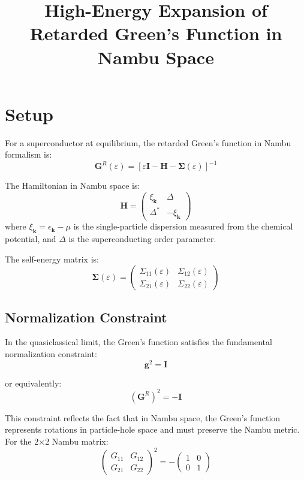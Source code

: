 \documentclass[12pt]{article}
\title{High-Energy Expansion of Retarded Green's Function in Nambu Space}
\author{}
\date{}
\begin{document}
\maketitle

\section{Setup}

For a superconductor at equilibrium, the retarded Green's function in Nambu formalism is:
\begin{equation}
\mathbf{G}^R(\varepsilon) = \left[\varepsilon \mathbf{I} - \mathbf{H} - \mathbf{\Sigma}(\varepsilon)\right]^{-1}
\end{equation}

The Hamiltonian in Nambu space is:
\begin{equation}
\mathbf{H} = \begin{pmatrix}
\xi_{\mathbf{k}} & \Delta \\
\Delta^* & -\xi_{\mathbf{k}}
\end{pmatrix}
\end{equation}
where $\xi_{\mathbf{k}} = \epsilon_{\mathbf{k}} - \mu$ is the single-particle dispersion measured from the chemical potential, and $\Delta$ is the superconducting order parameter.

The self-energy matrix is:
\begin{equation}
\mathbf{\Sigma}(\varepsilon) = \begin{pmatrix}
\Sigma_{11}(\varepsilon) & \Sigma_{12}(\varepsilon) \\
\Sigma_{21}(\varepsilon) & \Sigma_{22}(\varepsilon)
\end{pmatrix}
\end{equation}

\subsection{Normalization Constraint}

In the quasiclassical limit, the Green's function satisfies the fundamental normalization constraint:
\begin{equation}
\mathbf{g}^2 = \mathbf{I}
\end{equation}

or equivalently:
\begin{equation}
(\mathbf{G}^R)^2 = -\mathbf{I}
\end{equation}

This constraint reflects the fact that in Nambu space, the Green's function represents rotations in particle-hole space and must preserve the Nambu metric. For the 2×2 Nambu matrix:
\begin{equation}
\begin{pmatrix}
G_{11} & G_{12} \\
G_{21} & G_{22}
\end{pmatrix}^2 = -\begin{pmatrix}
1 & 0 \\
0 & 1
\end{pmatrix}
\end{equation}
\end{document}
